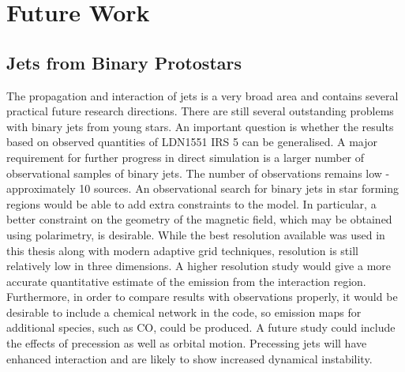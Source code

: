 

\pagebreak

\section{Future Work}


\subsection{Jets from Binary Protostars}
The propagation and interaction of jets is a very broad area and contains
several practical future research directions.
There are still several outstanding problems with binary jets from young stars.
An important question is whether the results based on observed quantities of
LDN1551 IRS 5 can be generalised.
A major requirement for further progress in direct simulation is a larger number
of observational samples of binary jets.  The number of observations remains low
- approximately 10 sources.  An observational search for binary jets in star
forming regions would be able to add extra constraints to the model.  In
particular, a better constraint on the geometry of the magnetic field, which may
be obtained using polarimetry, is desirable.  
While the best resolution
available was used in this thesis along with modern adaptive grid techniques,
resolution is still relatively low in three dimensions.  A higher resolution
study would give a more accurate quantitative estimate of the emission from the
interaction region.  Furthermore, in order to compare results with observations
properly, it would be desirable to include a chemical network in the code, so
emission maps for additional species, such as CO, could be produced.  A future
study could include the effects of precession as well as orbital motion.
Precessing jets will have enhanced interaction and are likely to show increased
dynamical instability.

